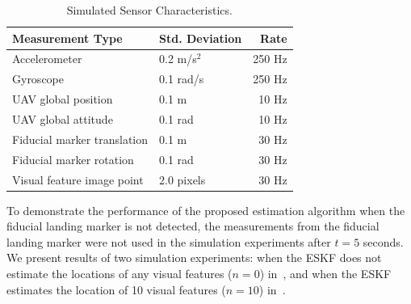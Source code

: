 \begin{table}[h!]
  \begin{center}
    \caption{Simulated Sensor Characteristics.}
    \label{tab:sim_meas_noise}
    \begin{tabular}{l|l|r}
      \textbf{Measurement Type} & \textbf{Std. Deviation} & \textbf{Rate} \\
      \hline
      Accelerometer & 0.2 m/s$^2$ & 250 Hz \\
      Gyroscope & 0.1 rad/s & 250 Hz \\
      UAV global position & 0.1 m & 10 Hz \\
      UAV global attitude & 0.1 rad & 10 Hz \\
      Fiducial marker translation & 0.1 m & 30 Hz \\
      Fiducial marker rotation & 0.1 rad & 30 Hz \\
      Visual feature image point & 2.0 pixels & 30 Hz \\
    \end{tabular}
  \end{center}
\end{table}

To demonstrate the performance of the proposed estimation algorithm when the
fiducial landing marker is not detected, the measurements from the fiducial
landing marker were not used in the simulation experiments after $t = 5$
seconds.
We present results of two simulation experiments: when the ESKF does not estimate
the locations of any visual features ($n = 0$) in~, and 
when the ESKF estimates the location of 10 visual features ($n =
10$) in~.

